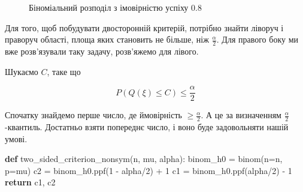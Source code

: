 \documentclass[
  letterpaper,
  10pt,
  openany]{report}
\newenvironment{Shaded}{\begin{snugshade}}{\end{snugshade}}
\newcommand{\ControlFlowTok}[1]{\textcolor[rgb]{0.00,0.23,0.31}{\textbf{#1}}}
\newcommand{\DecValTok}[1]{\textcolor[rgb]{0.68,0.00,0.00}{#1}}
\newcommand{\KeywordTok}[1]{\textcolor[rgb]{0.00,0.23,0.31}{\textbf{#1}}}
\newcommand{\NormalTok}[1]{\textcolor[rgb]{0.00,0.23,0.31}{#1}}
\newcommand{\OperatorTok}[1]{\textcolor[rgb]{0.37,0.37,0.37}{#1}}
\theoremstyle{definition}
\theoremstyle{remark}
\begin{document}
\begin{figure}[H]


\caption{\label{fig-binom-pmf-two-sided-nonsym}Біноміальний розподіл з
імовірністю успіху \(0.8\)}

\end{figure}%

Для того, щоб побудувати двосторонній критерій, потрібно знайти ліворуч
і праворуч області, площа яких становить не більше, ніж
\(\frac{\alpha}{2}\). Для правого боку ми вже розв'язували таку задачу,
розв'яжемо для лівого.

Шукаємо \(C\), таке що

\[
P(Q(\xi) \leqslant C) \leqslant \frac{\alpha}{2}
\]

Спочатку знайдемо перше число, де ймовірність
\(\geqslant \frac{\alpha}{2}\). А це за визначенням
\(\frac{\alpha}{2}\)-квантиль. Достатньо взяти попереднє число, і воно
буде задовольняти нашій умові.

\begin{Shaded}
\begin{Highlighting}[]
\KeywordTok{def}\NormalTok{ two\_sided\_criterion\_nonsym(n, mu, alpha):}
\NormalTok{    binom\_h0 }\OperatorTok{=}\NormalTok{ binom(n}\OperatorTok{=}\NormalTok{n, p}\OperatorTok{=}\NormalTok{mu)}
\NormalTok{    c2 }\OperatorTok{=}\NormalTok{ binom\_h0.ppf(}\DecValTok{1} \OperatorTok{{-}}\NormalTok{ alpha}\OperatorTok{/}\DecValTok{2}\NormalTok{) }\OperatorTok{+} \DecValTok{1}
\NormalTok{    c1 }\OperatorTok{=}\NormalTok{ binom\_h0.ppf(alpha}\OperatorTok{/}\DecValTok{2}\NormalTok{) }\OperatorTok{{-}} \DecValTok{1}
    \ControlFlowTok{return}\NormalTok{ c1, c2}
\end{Highlighting}
\end{Shaded}
\end{document}
